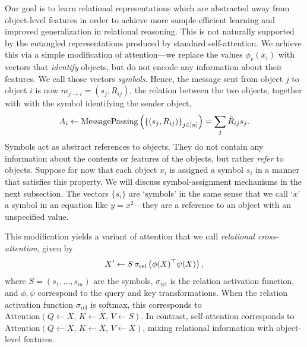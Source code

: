 Our goal is to learn relational representations which are abstracted away from object-level features in order to achieve more sample-efficient learning and improved generalization in relational reasoning. This is not naturally supported by the entangled representations produced by standard self-attention. We achieve this via a simple modification of attention---we replace the values $\phi_v(x_i)$ with vectors that \textit{identify} objects, but do not encode any information about their features. We call those vectors \textit{symbols}. Hence, the message sent from object $j$ to object $i$ is now $m_{j \to i} = (s_j, R_{ij})$, the relation between the two objects, together with with the symbol identifying the sender object,
\begin{equation}\label{eq:relational_crossattn_message_passing}
    A_i \gets \mathrm{MessagePassing}\left(\left\{(s_j, R_{ij})\right\}_{j \in [n]}\right) = \sum_{j} \bar{R}_{ij} s_j.
\end{equation}
Symbols act as abstract references to objects. They do not contain any information about the contents or features of the objects, but rather \textit{refer} to objects.
Suppose for now that each object $x_i$ is assigned a symbol $s_i$ in a manner that satisfies this property. We will discuss symbol-assignment mechanisms in the next subsection.
The vectors $\{s_i\}$ are `symbols' in the same sense that we call `$x$' a symbol in an equation like $y = x^2$---they are a reference to an object with an unspecified value.

This modification yields a variant of attention that we call \textit{relational cross-attention}, given by
\begin{equation}\label{eq:relational_crossattn}
    X' \gets S \, \sigma_{\mathrm{rel}}\left(\phi(X)^\top \psi(X)\right),
\end{equation}
where $S = (s_1, \ldots, s_m)$ are the symbols, $\sigma_{\mathrm{rel}}$ is the relation activation function, and $\phi, \psi$ correspond to the query and key transformations. When the relation activation function $\sigma_{\mathrm{rel}}$ is softmax, this corresponds to $\mathrm{Attention}(Q \gets X,\, K \gets X,\, V \gets S)$. In contrast, self-attention corresponds to $\mathrm{Attention}(Q \gets X,\, K \gets X,\, V \gets X)$, mixing relational information with object-level features.

